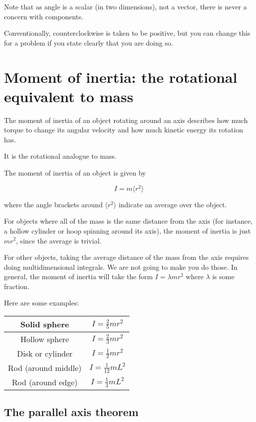\documentclass[10pt]{article}
\begin{document}
Note that as angle is a scalar (in two dimensions), not a vector, there is never a concern with components.

Conventionally, counterclockwise is taken to be positive, but you can change this for a problem if you state clearly that you are doing so.

\section{Moment of inertia: the rotational equivalent to mass}

The moment of inertia of an object rotating around an axis describes how much torque to change its angular velocity and how much kinetic energy its rotation has.

It is the rotational analogue to mass.

The moment of inertia of an object is given by 

$$I = m\langle r^2 \rangle$$

where the angle brackets around $\langle r^2 \rangle$ indicate an average over the object.

For objects where all of the mass is the same distance from the axis (for instance, a hollow cylinder or hoop spinning around its axis), the moment of inertia is just $mr^2$, since the average is trivial.

For other objects, taking the average distance of the mass from the axis requires doing multidimensional integrals. We are not going to make you do those. In general, the moment of inertia will take the form $I = \lambda mr^2$ where $\lambda$ is some fraction.

Here are some examples:

\begin{tabular}{|c | c|}
	\hline
Solid sphere & $I=\frac{2}{5}mr^2$\\	\hline
Hollow sphere & $I=\frac{2}{3}mr^2$\\	\hline
Disk or cylinder & $I=\frac{1}{2}mr^2$\\	\hline
Rod (around middle) & $I=\frac{1}{12}mL^2$\\	\hline
Rod (around edge) & $I=\frac{1}{3}mL^2$\\	\hline
\end{tabular}

\subsection{The parallel axis theorem}
\end{document}
